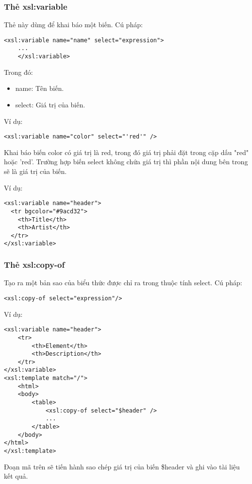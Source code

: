 \subsubsection {Thẻ xsl:variable}
Thẻ này dùng để khai báo một biến. Cú pháp:
\lstset{language=XML}
\begin{lstlisting}[escapechar=`]
	<xsl:variable name="name" select="expression">
	...
	</xsl:variable>
\end{lstlisting}
Trong đó:
\begin{itemize}

\item {\ttfamily  name}: Tên biến.

\item {\ttfamily  select}: Giá trị của biến.
\end{itemize}
Ví dụ:
\begin{lstlisting}[escapechar=`]
	<xsl:variable name="color" select="'red'" />
\end{lstlisting}

Khai báo biến {\ttfamily color} có giá trị là {\ttfamily red}, trong đó giá trị phải đặt trong cặp dấu {\ttfamily "red"} hoặc {\ttfamily 'red'}. Trường hợp biến {\ttfamily select} không chứa giá trị thì phần nội dung bên trong sẽ là giá trị của biến.

Ví dụ:
\lstset{language=XML}
\begin{lstlisting}[escapechar=`]
<xsl:variable name="header">
  <tr bgcolor="#9acd32">
    <th>Title</th>
    <th>Artist</th>
  </tr>
</xsl:variable>
\end{lstlisting}
\subsubsection {Thẻ xsl:copy-of}
Tạo ra một bản sao của biểu thức được chỉ ra trong thuộc tính {\ttfamily select}. Cú pháp:
\lstset{language=XML}
\begin{lstlisting}[escapechar=`]
	<xsl:copy-of select="expression"/>
\end{lstlisting}

Ví dụ:
\lstset{language=XML}
\begin{lstlisting}[escapechar=`]
<xsl:variable name="header">
	<tr>
		<th>Element</th>
		<th>Description</th>
	</tr>
</xsl:variable>
<xsl:template match="/">
	<html>
	<body>
		<table>
			<xsl:copy-of select="$header" />
			...
		</table>
	</body>
</html>
</xsl:template>
\end{lstlisting}

Đoạn mã trên sẽ tiến hành sao chép giá trị của biến {\ttfamily \$header} và ghi vào tài liệu kết quả.

